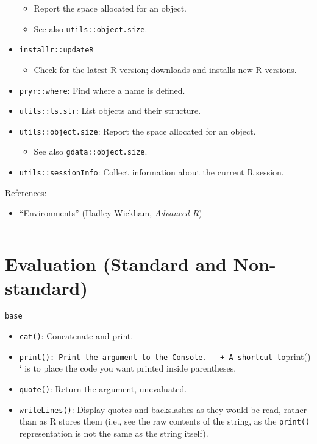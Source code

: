 \documentclass[
]{book}
\providecommand{\tightlist}{%
  \setlength{\itemsep}{0pt}\setlength{\parskip}{0pt}}
\begin{document}
\begin{itemize}
  \begin{itemize}
  \tightlist
  \item
    Report the space allocated for an object.
  \item
    See also \texttt{utils::object.size}.
  \end{itemize}
\item
  \texttt{installr::updateR}

  \begin{itemize}
  \tightlist
  \item
    Check for the latest R version; downloads and installs new R versions.
  \end{itemize}
\item
  \texttt{pryr::where}: Find where a name is defined.
\item
  \texttt{utils::ls.str}: List objects and their structure.
\item
  \texttt{utils::object.size}: Report the space allocated for an object.

  \begin{itemize}
  \tightlist
  \item
    See also \texttt{gdata::object.size}.
  \end{itemize}
\item
  \texttt{utils::sessionInfo}: Collect information about the current R session.
\end{itemize}

References:

\begin{itemize}
\tightlist
\item
  \href{http://adv-r.had.co.nz/Environments.html\#environments}{``Environments''} (Hadley Wickham, \href{http://adv-r.had.co.nz/}{\emph{Advanced R}})
\end{itemize}

\begin{center}\rule{0.5\linewidth}{0.5pt}\end{center}

\hypertarget{evaluation-standard-and-non-standard}{%
\section{Evaluation (Standard and Non-standard)}\label{evaluation-standard-and-non-standard}}

\texttt{base}

\begin{itemize}
\tightlist
\item
  \texttt{cat()}: Concatenate and print.
\item
  \texttt{print():\ Print\ the\ argument\ to\ the\ Console.\ \ \ +\ A\ shortcut\ to}print()` is to place the code you want printed inside parentheses.
\item
  \texttt{quote()}: Return the argument, unevaluated.
\item
  \texttt{writeLines()}: Display quotes and backslashes as they would be read, rather than as R stores them (i.e., see the raw contents of the string, as the \texttt{print()} representation is not the same as the string itself).
\end{itemize}
\end{document}
